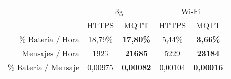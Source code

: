 \begin{tabular}{|r|c|c|c|c|}
  \cline{2-5}
  \hhline{~--|--|}
  \rowcolor[HTML]{FFEAD0}
  \multicolumn{1}{c|}{\cellcolor[HTML]{FFFFFF}} & \multicolumn{2}{c|}{3g} & \multicolumn{2}{c|}{Wi-Fi} \\
  \hhline{~|-|-|-|-|}
  \rowcolor[HTML]{E3FFE3}
  \multicolumn{1}{c|}{\cellcolor[HTML]{FFFFFF}} & \multicolumn{1}{c|}{HTTPS} & MQTT & HTTPS & MQTT \\
  \hline
  \cellcolor[HTML]{E4FFFE}\% Batería / Hora & 18,79\% & \textbf{17,80\%} & 5,44\% & \textbf{3,66\%} \\
  \hline
  \cellcolor[HTML]{E4FFFE}Mensajes / Hora & 1926 & \textbf{21685} & 5229 & \textbf{23184} \\
  \hline
  \cellcolor[HTML]{E4FFFE}\% Batería / Mensaje & 0,00975 & \textbf{0,00082} & 0,00104 & \textbf{0,00016} \\
  \hline
\end{tabular}